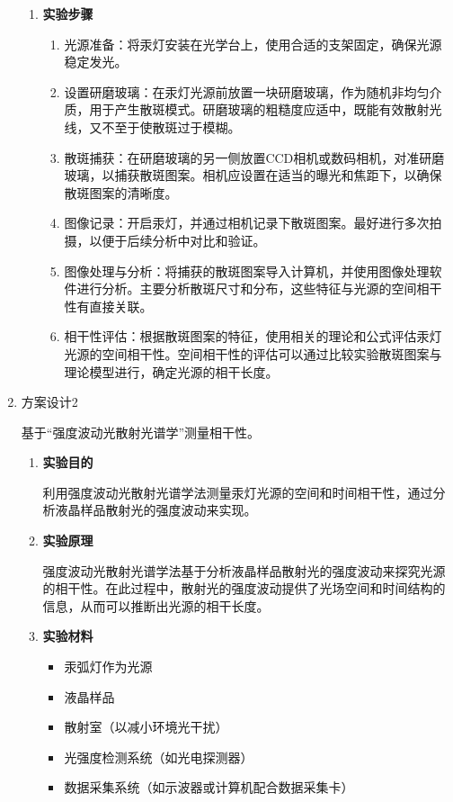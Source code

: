 \documentclass[dvipsnames, svgnames,a4paper,11pt]{article}
\begin{document}
\begin{enumerate}
\begin{enumerate}
			\item \textbf{实验步骤}
			
			\begin{enumerate}
				\item 光源准备：将汞灯安装在光学台上，使用合适的支架固定，确保光源稳定发光。
				\item 设置研磨玻璃：在汞灯光源前放置一块研磨玻璃，作为随机非均匀介质，用于产生散斑模式。研磨玻璃的粗糙度应适中，既能有效散射光线，又不至于使散斑过于模糊。
				\item 散斑捕获：在研磨玻璃的另一侧放置CCD相机或数码相机，对准研磨玻璃，以捕获散斑图案。相机应设置在适当的曝光和焦距下，以确保散斑图案的清晰度。
				\item 图像记录：开启汞灯，并通过相机记录下散斑图案。最好进行多次拍摄，以便于后续分析中对比和验证。
				\item 图像处理与分析：将捕获的散斑图案导入计算机，并使用图像处理软件进行分析。主要分析散斑尺寸和分布，这些特征与光源的空间相干性有直接关联。
				\item 相干性评估：根据散斑图案的特征，使用相关的理论和公式评估汞灯光源的空间相干性。空间相干性的评估可以通过比较实验散斑图案与理论模型进行，确定光源的相干长度。
			\end{enumerate}
		\end{enumerate}
		
		\item 方案设计2
		
		基于“强度波动光散射光谱学”测量相干性。
		
		\begin{enumerate}
			\item \textbf{实验目的}
			
			利用强度波动光散射光谱学法测量汞灯光源的空间和时间相干性，通过分析液晶样品散射光的强度波动来实现。
			
			\item \textbf{实验原理}
			
			强度波动光散射光谱学法基于分析液晶样品散射光的强度波动来探究光源的相干性。在此过程中，散射光的强度波动提供了光场空间和时间结构的信息，从而可以推断出光源的相干长度。
			
			\item \textbf{实验材料}
			
			\begin{itemize}
				\item 汞弧灯作为光源
				\item 液晶样品
				\item 散射室（以减小环境光干扰）
				\item 光强度检测系统（如光电探测器）
				\item 数据采集系统（如示波器或计算机配合数据采集卡）
			\end{itemize}
			

\end{enumerate}
\end{enumerate}
\end{document}
